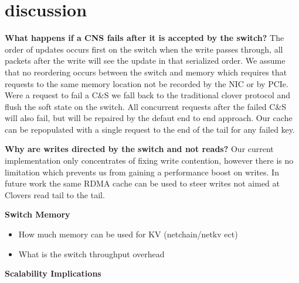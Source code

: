 \section{discussion}

\textbf{What happens if a CNS fails after it is accepted by the switch?}
The order of updates occurs first on the switch when the write passes
through, all packets after the write will see the update in that serialized
order. We assume that no reordering occurs between the switch and memory
which requires that requests to the same memory location not be recorded by
the NIC or by PCIe. Were a request to fail a C&S we fall back to the
traditional clover protocol and flush the soft state on the switch. All
concurrent requests after the failed C&S will also fail, but will be repaired
by the defaut end to end approach. Our cache can be repopulated with a single
request to the end of the tail for any failed key.

\textbf{Why are writes directed by the switch and not reads?}
Our current implementation only concentrates of fixing write contention,
however there is no limitation which prevents us from gaining a performance
boost on writes. In future work the same RDMA cache can be used to steer
writes not aimed at Clovers read tail to the tail.

\textbf{Switch Memory}
\begin{itemize}
    \item{How much memory can be used for KV (netchain/netkv ect)}
    \item{What is the switch throughput overhead}
\end{itemize}


\textbf{Scalability Implications}
